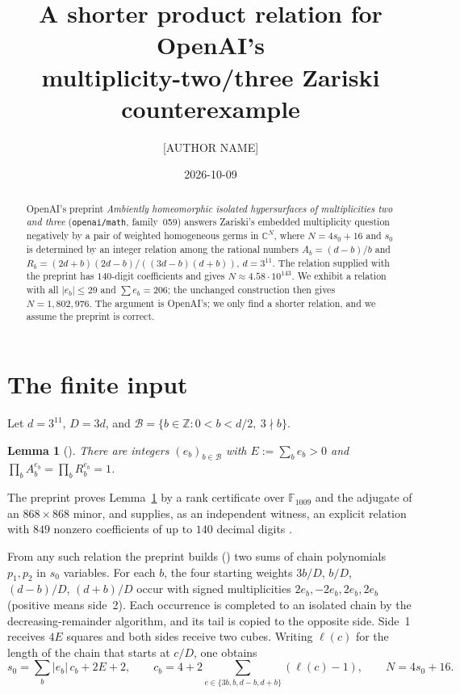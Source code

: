 \documentclass[11pt]{amsart}
\title[A shorter product relation for the Zariski multiplicity counterexample]{A shorter product relation for OpenAI's\\ multiplicity-two/three Zariski counterexample}
\author{[AUTHOR NAME]}
\date{2026-10-09}
\newtheorem{lemma}[theorem]{Lemma}
\theoremstyle{remark}
\newcommand{\Z}{\mathbb{Z}}
\newcommand{\C}{\mathbb{C}}
\newcommand{\B}{\mathcal{B}}
\begin{document}
\begin{abstract}\sloppy
OpenAI's preprint \emph{Ambiently homeomorphic isolated hypersurfaces of multiplicities two and three}
(\texttt{openai/math}, family~059) answers Zariski's embedded multiplicity question negatively by a
pair of weighted homogeneous germs in $\C^N$, where $N=4s_0+16$ and $s_0$ is determined by an
integer relation among the rational numbers $A_b=(d-b)/b$ and $R_b=(2d+b)(2d-b)/((3d-b)(d+b))$, $d=3^{11}$.
The relation supplied with the preprint has $140$-digit coefficients and gives $N\approx4.58\cdot10^{143}$.
We exhibit a relation with all $|e_b|\le29$ and $\sum e_b=206$; the unchanged construction then gives
$N=1{,}802{,}976$. The argument is OpenAI's; we only find a shorter relation, and we assume the
preprint is correct.
\end{abstract}
\maketitle

\section{The finite input}
Let $d=3^{11}$, $D=3d$, and $\B=\{b\in\Z:0<b<d/2,\ 3\nmid b\}$.
\begin{lemma}[{\cite[Lemma~\texttt{seed:product}]{OAI059}}]\label{lem:product}
There are integers $(e_b)_{b\in\B}$ with $E:=\sum_b e_b>0$ and
$\prod_b A_b^{e_b}=\prod_b R_b^{e_b}=1$.
\end{lemma}
The preprint proves Lemma~\ref{lem:product} by a rank certificate over $\mathbb F_{1009}$ and the
adjugate of an $868\times868$ minor, and supplies, as an independent witness, an explicit relation with
$849$ nonzero coefficients of up to $140$ decimal digits \cite[App.~A]{OAI059}.

From any such relation the preprint builds (\cite[Prop.~\texttt{seed:seeds}]{OAI059}) two sums of chain
polynomials $p_1,p_2$ in $s_0$ variables. For each $b$, the four starting weights
$3b/D$, $b/D$, $(d-b)/D$, $(d+b)/D$ occur with signed multiplicities $2e_b,-2e_b,2e_b,2e_b$
(positive means side~2). Each occurrence is completed to an isolated chain by the
decreasing-remainder algorithm, and its tail is copied to the opposite side. Side~1 receives $4E$ squares and
both sides receive two cubes. Writing $\ell(c)$ for the length of the chain that starts at $c/D$, one
obtains
\begin{equation}\label{eq:N}
s_0=\sum_{b}|e_b|\,c_b+2E+2,\qquad c_b=4+2\!\!\sum_{c\in\{3b,b,d-b,d+b\}}\!\!(\ell(c)-1),
\qquad N=4s_0+16 .
\end{equation}
\end{document}
